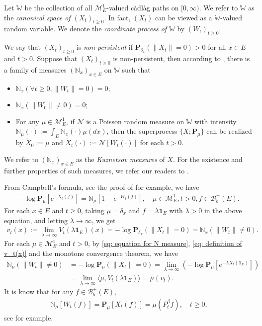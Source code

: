 \documentclass[12pt,a4paper]{amsart}
\theoremstyle{definition}
\numberwithin{equation}{section}
\begin{document}
Let $\mathbb W$ be the collection of all $\mathcal M^1_E$-valued c\`{a}dl\`{a}g paths on $[0,\infty)$.
We refer to $\mathbb W$ as the \emph{canonical space of $(X_t)_{t\geq 0}$}.
In fact, $(X_t)$ can be viewed as a $\mathbb W$-valued random variable.
We denote the \emph{coordinate process of $\mathbb W$} by $(W_t)_{t\geq 0}$.

We say that $(X_t)_{t\geq 0}$ is \emph{non-persistent} if $\mathbf P_{\delta_x}(\|X_t\|= 0) > 0$ for all $x\in E$ and $t> 0$.
Suppose that $(X_t)_{t\geq 0}$ is non-persistent, then according to \cite[Section 8.4]{Li2011Measure-valued}, there is a family of measures $(\mathbb N_x)_{x\in E}$ on $\mathbb W$ such that
\begin{itemize}
\item
	$\mathbb N_x (\forall t \geq 0, \|W_t\|=0) =0$;
\item
	$\mathbb N_x(\|W_0 \|\neq 0) = 0$;
\item
	For any $\mu \in \mathcal M_E^1$, if $\mathcal N$ is a Poisson random measure on $\mathbb W$ with intensity $\mathbb N_\mu(\cdot):= \int_E \mathbb N_x(\cdot )\mu(dx)$, then the superprocess $\{X;\mathbf P_\mu\}$ can be realized by $\widetilde X_0 := \mu$ and $\widetilde X_t(\cdot) := \mathcal N[W_t(\cdot)]$ for each $t>0$.
\end{itemize}
We refer to $(\mathbb N_x)_{x\in E}$ as the \emph{Kuznetsov measures} of $X$.
For the existence and further properties of such measures, we refer our readers to \cite{Li2011Measure-valued}.

From  Campbell's formula, see  the proof of \cite[Theorem 2.7]{Kyprianou2014Fluctuations} for example, we have
\begin{align} \label{eq: equation for N measure}
	- \log \mathbf P_\mu [e^{-X_t(f)}]
	= \mathbb N_\mu[ 1-e^{- W_t(f)}],
	\quad \mu \in \mathcal M_E^1, t>0, f\in \mathscr B_b^+(E).
\end{align}
For each $x\in E$ and $t\geq 0$, taking $\mu = \delta_x$ and $f = \lambda \mathbf 1_E$ with $\lambda > 0$ in the above equation, and letting $\lambda \to \infty$, we get
\begin{align} \label{eq: definition of v_t(x)}
	v_t(x)
	:= \lim_{\lambda\to \infty} V_t(\lambda\mathbf 1_E)(x)
	= -\log \mathbf P_{\delta_x} (\|X_t\|=0)
	= \mathbb N_x(\|W_t\|\neq 0).
\end{align}
For each $\mu \in \mathcal M_E^1$ and $t > 0$, by \eqref{eq: equation for N measure}, \eqref{eq: definition of v_t(x)} and the monotone convergence theorem, we have
\begin{align}
  \mathbb N_\mu(\|W_t\|\neq 0)
	&= -\log \mathbf P_{\mu} (\|X_t\|=0)
   = \lim_{\lambda \to \infty} (- \log \mathbf P_\mu [e^{-\lambda X_t(\mathbf 1_E)}])
	\\\label{eq: equation for mu v-t}
	&= \lim_{\lambda \to \infty} \langle \mu, V_t(\lambda \mathbf 1_E)\rangle
   = \mu(v_t).
\end{align}
It is know that for any $f\in\mathscr B_b^+(E)$,
\begin{align}\label{eq: mean of kuz measure}
  \mathbb N_{\mu}[W_t(f)]
  =\mathbf P_{\mu}[X_t(f)]=\mu(P^\beta_tf),
	\quad t \geq 0,
\end{align}
see \cite[Lemma 3.3]{RenSongSun2017Spine} for example.
\end{document}
